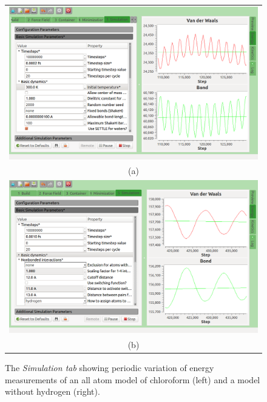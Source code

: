 \documentclass{article}
\begin{document}
\begin{figure}
\begin{center}
  \begin{tabular}{c}
  \includegraphics[scale=0.4]{simulationTabA.png} \\
  (a) \\
  \includegraphics[scale=0.4]{simulationTabB.png} \\
  (b) \\
  \end{tabular}
  \caption{The \textit{Simulation tab} showing periodic variation of energy measurements of an all atom model of chloroform (left) and a model without hydrogen (right).}
  \label{fig:simulationTab}

\end{center}\end{figure}
\end{document}
